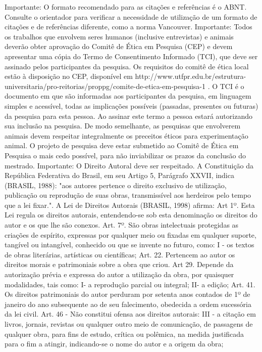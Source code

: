 Importante: O formato recomendado para as citações e referências é o ABNT. Consulte o orientador para verificar a necessidade de utilização de um formato de citações e de referências diferente, como a norma Vancouver.
Importante: Todos os trabalhos que envolvem seres humanos (inclusive entrevistas) e animais deverão obter aprovação do Comitê de Ética em Pesquisa (CEP) e devem apresentar uma cópia do Termo de Consentimento Informado (TCI), que deve ser assinado pelos participantes da pesquisa. Os requisitos do comitê de ética local estão à disposição no CEP, disponível em http://www.utfpr.edu.br/estrutura-universitaria/pro-reitorias/proppg/comite-de-etica-em-pesquisa-1 . O TCI é o documento em que são informadas aos participantes da pesquisa, em linguagem simples e acessível, todas as implicações possíveis (passadas, presentes ou futuras) da pesquisa para esta pessoa. Ao assinar este termo a pessoa estará autorizando sua inclusão na pesquisa. De modo semelhante, as pesquisas que envolverem animais devem respeitar integralmente os preceitos éticos para experimentação animal. 
O projeto de pesquisa deve estar submetido ao Comitê de Ética em Pesquisa o mais cedo possível, para não inviabilizar os prazos da conclusão do mestrado.
Importante: O Direito Autoral deve ser respeitado. A Constituição da República Federativa do Brasil, em seu Artigo 5, Parágrafo XXVII, indica (BRASIL, 1988): "aos autores pertence o direito exclusivo de utilização, publicação ou reprodução de suas obras, transmissível aos herdeiros pelo tempo que a lei fixar.". A Lei de Direitos Autorais (BRASIL, 1998) afirma:
Art 1º. Esta Lei regula os direitos autorais, entendendo-se sob esta denominação os direitos do autor e os que lhe são conexos.
Art. 7º. São obras intelectuais protegidas as criações de espírito, expressas por qualquer meio ou fixadas em qualquer suporte, tangível ou intangível, conhecido ou que se invente no futuro, como:
I - os textos de obras literárias, artísticas ou científicas;
Art. 22. Pertencem ao autor os direitos morais e patrimoniais sobre a obra que criou.
Art 29. Depende da autorização prévia e expressa do autor a utilização da obra, por quaisquer modalidades, tais como: 
I- a reprodução parcial ou integral;
II- a edição; 
Art. 41. Os direitos patrimoniais do autor perduram por setenta anos contados de 1º de janeiro do ano subsequente ao de seu falecimento, obedecida a ordem sucessória da lei civil.
Art. 46 - Não constitui ofensa aos direitos autorais: 
III - a citação em livros, jornais, revistas ou qualquer outro meio de comunicação, de passagens de qualquer obra, para fins de estudo, crítica ou polêmica, na medida justificada para o fim a atingir, indicando-se o nome do autor e a origem da obra;
